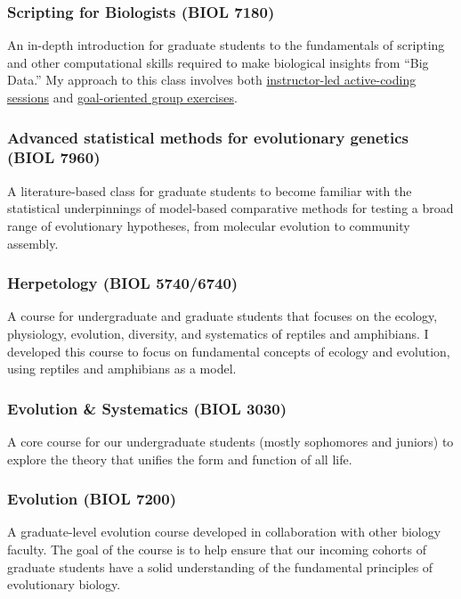 \subsubsection*{Scripting for Biologists (BIOL 7180)}
An in-depth introduction for graduate students to the fundamentals of scripting
and other computational skills required to make biological insights from ``Big
Data.''
My approach to this class involves both
\href{http://phyletica.org/slides/python/intro/}{instructor-led active-coding
    sessions}
and
\href{https://github.com/joaks1/python-translation-project}{goal-oriented group
    exercises}.

\subsubsection*{Advanced statistical methods for evolutionary genetics (BIOL 7960)}
A literature-based class for graduate students to become familiar with the
statistical underpinnings of model-based comparative methods for testing a
broad range of evolutionary hypotheses, from molecular evolution to community
assembly.

\subsubsection*{Herpetology (BIOL 5740/6740)}
A course for undergraduate and graduate students that focuses on the ecology,
physiology, evolution, diversity, and systematics of reptiles and amphibians.
I developed this course to focus on fundamental concepts of ecology and
evolution, using reptiles and amphibians as a model.

\subsubsection*{Evolution \& Systematics (BIOL 3030)}
A core course for our undergraduate students (mostly sophomores and juniors) to
explore the theory that unifies the form and function of all life.

\subsubsection*{Evolution (BIOL 7200)}
A graduate-level evolution course developed in collaboration with other biology
faculty.
The goal of the course is to help ensure that our incoming cohorts of graduate
students have a solid understanding of the fundamental principles of
evolutionary biology.

